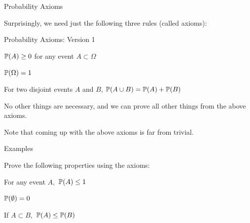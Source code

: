 \documentclass[fleqn,aspectratio=169]{beamer}
\begin{document}
\begin{frame}{Probability Axioms}

\plitemsep 0.1in

\bci 

\item<1-> Surprisingly, we need just the following three rules (called axioms):

\medskip

{
\begin{block}{Probability Axioms: Version 1}

\bce[{A}1.] 
\item {} $\mathbb{P}( A ) \geq 0$ for any event $A \subset \Omega$
\item {} $\mathbb{P}( \Omega ) = 1$
\item {} For two disjoint events $A$ and $B$, $\mathbb{P}( A \cup B ) = \mathbb{P}( A ) + \mathbb{P}( B )$
\ece
\end{block}
}

\item<3-> No other things are necessary, and we can prove all other 
things from the above axioms.

\item<4-> Note that coming up with the above axioms is far from trivial. 

\eci

\end{frame}

\begin{frame}{Examples}

Prove the following properties using the axioms:

\plitemsep 0.1in


\bce 
\item For any event $A,$ $\mathbb{P}( A ) \leq 1$

\item $\mathbb{P}( \emptyset ) = 0$

\item If $A \subset B,$ $\mathbb{P}( A ) \leq \mathbb{P}( B )$
\ece

\end{frame}
\end{document}
